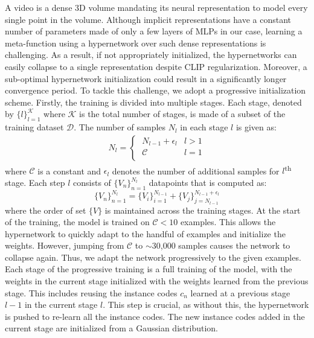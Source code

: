 \documentclass[10pt]{article} \usepackage[accepted]{tmlr}
\begin{document}
A video is a dense $3$D volume mandating its neural representation to model every single point in the volume. Although implicit representations have a constant number of parameters made of only a few layers of MLPs in our case, learning a meta-function using a hypernetwork over such dense representations is challenging. As a result, if not appropriately initialized, the hypernetworks can easily collapse to a single representation despite CLIP regularization. Moreover, a sub-optimal hypernetwork initialization could result in a significantly longer convergence period. To tackle this challenge, we adopt a progressive initialization scheme. Firstly, the training is divided into multiple stages. Each stage, denoted by $\{l\}_{l=1}^{\mathcal{K}}$ where $\mathcal{K}$ is the total number of stages, is made of a subset of the training dataset $\mathcal{D}$. The number of samples $N_{l}$ in each stage $l$ is given as:
\begin{equation}
    \begin{split}
    N_{l} = 
    \begin{cases}
      \; N_{l-1} + \epsilon_{l} & l > 1\\
      \; \mathcal{C} & l = 1\\
    \end{cases}  
    \end{split}
\end{equation}
where $\mathcal{C}$ is a constant and $\epsilon_{l}$ denotes the number of additional samples for $l$\textsuperscript{th} stage. Each step $l$ consists of $\{V_n\}_{n=1}^{N_{l}}$ datapoints that is computed as:
\begin{equation}
     \{V_n\}_{n=1}^{N_{l}} = \{V_i\}_{i=1}^{N_{l-1}} + \{V_j\}_{j=N_{l-1}}^{N_{l-1} + \epsilon_l}
\end{equation}
where the order of set $\{V\}$ is maintained across the training stages. At the start of the training, the model is trained on $\mathcal{C} < 10$ examples. This allows the hypernetwork to quickly adapt to the handful of examples and initialize the weights. However, jumping from $\mathcal{C}$ to $\sim 30$,$000$ samples causes the network to collapse again. Thus, we adapt the network progressively to the given examples. Each stage of the progressive training is a full training of the model, with the weights in the current stage initialized with the weights learned from the previous stage. 
This includes reusing the instance codes $c_n$ learned at a previous stage $l-1$ in the current stage $l$. This step is crucial, as without this, the hypernetwork is pushed to re-learn all the instance codes. 
The new instance codes added in the current stage are initialized from a Gaussian distribution.
\end{document}

